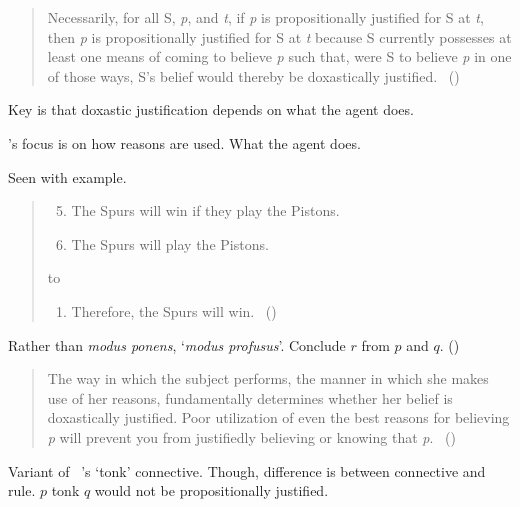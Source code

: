 \begin{note}
  \citeauthor{Turri:2010aa}

  \begin{quote}
    Necessarily, for all S, \emph{p}, and \emph{t}, if \emph{p} is propositionally justified for S at \emph{t}, then \emph{p} is propositionally justified for S at \emph{t} because S currently possesses at least one means of coming to believe \emph{p} such that, were S to believe \emph{p} in one of those ways, S's belief would thereby be doxastically justified.%
    \mbox{ }\hfill\mbox{(\citeyear[316]{Turri:2010aa})}
  \end{quote}

  Key is that doxastic justification depends on what the agent does.

  \citeauthor{Turri:2010aa}'s focus is on how reasons are used.
  What the agent does.

  Seen with example.

  \begin{quote}
    \begin{enumerate}[label=(P\arabic*)]
      \setcounter{enumi}{4}
    \item
      The Spurs will win if they play the Pistons.
    \item
      The Spurs will play the Pistons.
    \end{enumerate}

    \hbox to \hsize{\hfil{\vdots}\hfil}

    \begin{enumerate}[label=(P\arabic*), resume]
    \item
      Therefore, the Spurs will win.%
    \mbox{ }\hfill\mbox{(\citeyear[317]{Turri:2010aa})}
    \end{enumerate}
  \end{quote}

  Rather than \emph{modus ponens}, `\emph{modus profusus}'.
  Conclude \(r\) from \(p\) and \(q\).
  (\citeyear[317]{Turri:2010aa})

  \begin{quote}
    The way in which the subject performs, the manner in which she makes use of her reasons, fundamentally determines whether her belief is doxastically justified.
    Poor utilization of even the best reasons for believing \emph{p} will prevent you from justifiedly believing or knowing that \emph{p}.%
    \mbox{ }\hfill\mbox{(\citeyear[316]{Turri:2010aa})}
  \end{quote}

  Variant of ~\cite{Prior:1960wh}'s `tonk' connective.
  Though, difference is between connective and rule.
  \(p\) tonk \(q\) would not be propositionally justified.
\end{note}

